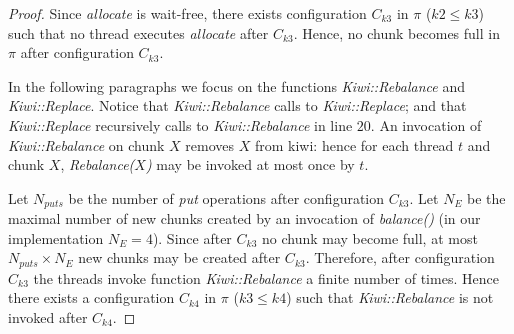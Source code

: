 \begin{proof}
{Since \emph{allocate} is wait-free, there exists configuration $C_{k3}$ in $\pi$ ($k2 \leq k3$) such that
no thread executes \emph{allocate} after $C_{k3}$.
Hence, no chunk becomes full in $\pi$ after configuration $C_{k3}$.



In the following paragraphs we focus on the functions \emph{Kiwi::Rebalance} and \emph{Kiwi::Replace}.
Notice that \emph{Kiwi::Rebalance} calls to \emph{Kiwi::Replace}; and that \emph{Kiwi::Replace} recursively calls to \emph{Kiwi::Rebalance} in line $20$.
An invocation of \emph{Kiwi::Rebalance} on chunk $X$ removes $X$ from kiwi:
hence for each thread $t$ and chunk $X$, \emph{Rebalance($X$)} may be invoked at most once by $t$.

Let $N_{puts}$ be the number of \emph{put} operations after configuration $C_{k3}$.
Let $N_E$ be the maximal number of new chunks created by an invocation of \emph{balance()} (in our implementation $N_E=4$).
Since after $C_{k3}$ no chunk may become full, at most $N_{puts} \times N_E$ new chunks may be created after $C_{k3}$.
Therefore, after configuration $C_{k3}$ the threads invoke function  \emph{Kiwi::Rebalance} a finite number of times.
Hence there exists a configuration $C_{k4}$ in $\pi$ ($k3 \leq k4$) such that \emph{Kiwi::Rebalance} is not invoked after $C_{k4}$.





}
\end{proof}
